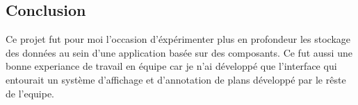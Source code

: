 \subsection{Conclusion}
\label{eiffageTablePlanConclusion}

Ce projet fut pour moi l'occasion d'éxpérimenter plus en profondeur les stockage des données au sein d'une application basée sur des composants.
Ce fut aussi une bonne experiance de travail en équipe car je n'ai développé que l'interface qui entourait un système d'affichage et d'annotation de plans développé par le rêste de l'equipe.